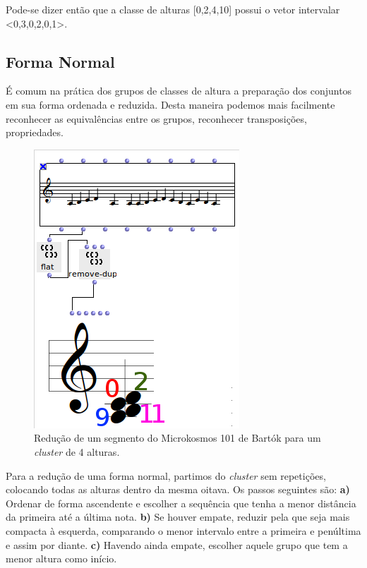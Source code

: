 \documentclass[
	12pt,				%
	openright,			%
	twoside,			%
	a4paper,			%
	english,			%
	french,				%
	spanish,			%
	brazil				%
	]{abntex2}
\begin{document}
Pode-se dizer então que a classe de alturas [0,2,4,10] possui o vetor intervalar <0,3,0,2,0,1>.


\subsection{Forma Normal} 

É comum na prática dos grupos de classes de altura a preparação dos conjuntos em sua forma ordenada e reduzida. Desta maneira podemos mais facilmente reconhecer as equivalências entre os grupos, reconhecer transposições, propriedades.


\begin{figure}[h]
	\caption{\label{fig_grafico}Redução de um segmento do Microkosmos 101 de Bartók para um \textit{cluster} de 4 alturas. }
	\begin{center}
	    \includegraphics[scale=0.7]{OM_settheory/reducao_acorde.png}
	\end{center}
\end{figure}

Para a redução de uma forma normal, partimos do \textit{cluster} sem repetições, colocando todas as alturas dentro da mesma oitava. Os passos seguintes são: 
\textbf{a)} Ordenar de forma ascendente e escolher a sequência que tenha a menor distância da primeira até a última nota.
\textbf{b)} Se houver empate, reduzir pela que seja mais compacta à esquerda, comparando o menor intervalo entre a primeira e penúltima e assim por diante.
\textbf{c)} Havendo ainda empate, escolher aquele grupo que tem a menor altura como início. 
\end{document}

